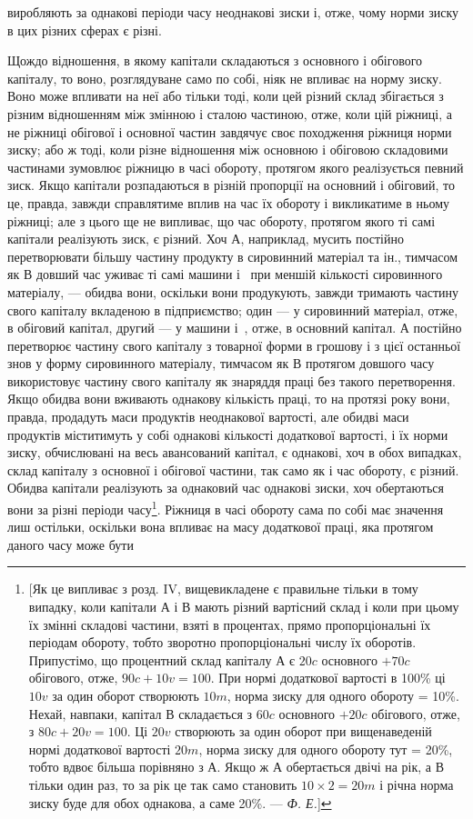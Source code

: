 \parcont{}  %
виробляють за однакові періоди часу неоднакові зиски і, отже,
чому норми зиску в цих різних сферах є різні.

Щождо відношення, в якому капітали складаються з основного і обігового капіталу, то воно,
розглядуване само по собі, ніяк не впливає на норму зиску. Воно може впливати на неї або тільки
тоді, коли цей різний склад збігається з різним відношенням між змінною і сталою частиною, отже,
коли цій ріжниці, а не ріжниці обігової і основної частин завдячує своє походження ріжниця норми
зиску; або ж тоді, коли різне відношення між основною і обіговою складовими частинами зумовлює
ріжницю в часі обороту, протягом якого реалізується певний зиск. Якщо капітали розпадаються в різній
пропорції на основний і обіговий, то це, правда, завжди справлятиме вплив
на час їх обороту і викликатиме в ньому ріжниці; але з цього
ще не випливає, що час обороту, протягом якого ті самі капітали реалізують зиск, є різний. Хоч $А$,
наприклад, мусить постійно перетворювати більшу частину продукту в сировинний матеріал та ін.,
тимчасом як $В$ довший час уживає ті самі
машини і~ при меншій кількості сировинного матеріалу, — обидва вони, оскільки вони продукують,
завжди тримають
частину свого капіталу вкладеною в підприємство; один — у сировинний матеріал, отже, в обіговий
капітал, другий — у машини
і~, отже, в основний капітал. $А$ постійно перетворює частину свого капіталу з товарної форми в
грошову і з цієї останньої знов у форму сировинного матеріалу, тимчасом як $В$ протягом довшого часу
використовує частину свого капіталу як
знаряддя праці без такого перетворення. Якщо обидва вони
вживають однакову кількість праці, то на протязі року вони,
правда, продадуть маси продуктів неоднакової вартості, але
обидві маси продуктів міститимуть у собі однакові кількості
додаткової вартості, і їх норми зиску, обчислювані на весь авансований капітал, є однакові, хоч в
обох випадках, склад капіталу з
основної і обігової частини, так само як і час обороту, є різний.
Обидва капітали реалізують за однаковий час однакові зиски, хоч
обертаються вони за різні періоди часу\footnote{
[Як це випливає з розд. IV, вищевикладене є правильне тільки в тому
випадку, коли капітали $А$ і $В$ мають різний вартісний склад і коли при цьому
їх змінні складові частини, взяті в процентах, прямо пропорціональні їх періодам обороту, тобто
зворотно пропорціональні числу їх оборотів. Припустімо,
що процентний склад капіталу $А$ є $20 c$ основного $+70 c$ обігового, отже,
$90 c + 10 v = 100$. При нормі додаткової вартості в 100\% ці $10 v$ за один оборот створюють $10 m$, норма
зиску для одного обороту = 10\%. Нехай, навпаки, капітал $В$ складається з $60 c$ основного $+20 c$
обігового, отже, з $80 c + 20 v = 100$.
Ці $20 v$ створюють за один оборот при вищенаведеній нормі додаткової вартості $20 m$, норма зиску для
одного обороту тут = 20\%, тобто вдвоє більша
порівняно з $А$. Якщо ж $А$ обертається двічі на рік, а $В$ тільки один раз, то за
рік це так само становить $10 × 2 = 20 m$ і річна норма зиску буде для обох
однакова, а саме 20\%. — \emph{Ф. Е.}]
}. Ріжниця в часі обороту
сама по собі має значення лиш остільки, оскільки вона впливає
на масу додаткової праці, яка протягом даного часу може бути
\parbreak{}  %
